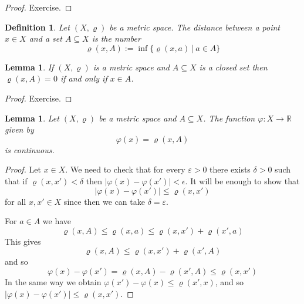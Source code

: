 \documentclass[11pt, letterpaper, oneside]{report}
\theoremstyle{pplain}
\newtheorem{lemma}[theorem]{Lemma}
\newtheorem{ITERMVALUE THM}[theorem]{Intermediate Value Theorem}
\newtheorem{HEINEBOREL THM}[theorem]{Heine-Borel Theorem}
\newtheorem{UMETR THM}[theorem]{Urysohn Metrization Theorem}
\newtheorem{UMETR2 THM}[theorem]{Urysohn Metrization Theorem (v.2)}
\theoremstyle{ddefinition}
\newtheorem{definition}[theorem]{Definition}
\theoremstyle{nnn}
\newtheorem{TDA NN}[theorem]{Topological Data Analysis. }
\theoremstyle{eexercise}
\newcommand{\R}{{\mathbb R}}
\begin{document}
 \begin{proof}
 Exercise. 
 \end{proof}


\begin{definition}
Let $(X, \varrho)$ be a metric space. The \emph{distance between a point  $x\in X$ 
and a set $A\subseteq X$} is  the number 
$$\varrho(x, A):= \inf\{ \varrho(x, a) \ | \  a\in A \} $$
\end{definition}

\begin{lemma}
\label{DIST CLOSED SET LEMMA}
If $(X, \varrho)$ is a metric space and $A\subseteq X$ is a closed set then $\varrho(x, A) = 0$ 
if and only if $x\in A$. 
\end{lemma}

\begin{proof}
Exercise.
\end{proof}


\begin{lemma}
\label{CONT SET DIST LEMMA}
Let $(X, \varrho)$ be a metric space and $A\subseteq X$.  The function $\varphi\colon X\to \R$
given by 
$$\varphi(x) = \varrho(x, A)$$
is continuous.
\end{lemma}

\begin{proof}
Let $x\in X$. We need to check that for every $\varepsilon>0$ there exists $\delta>0$ such that if 
$\varrho(x, x')< \delta$ then $|\varphi(x) - \varphi(x')| < \epsilon$.  It will be enough to show that 
$$|\varphi(x)-\varphi(x')| \leq \varrho(x, x')$$
for all $x, x'\in X$ since then we can take $\delta = \varepsilon$. 

For $a\in A$ we have 
$$\varrho(x, A) \leq \varrho(x, a) \leq \varrho(x, x') + \varrho(x', a)$$
This gives
$$\varrho(x, A) \leq \varrho(x, x') + \varrho(x', A)$$
and so 
$$\varphi(x)- \varphi(x')  = \varrho(x, A) - \varrho(x', A) \leq \varrho(x, x')$$
In the same way  we obtain $\varphi(x')- \varphi(x)   \leq \varrho(x', x)$,
 and so $|\varphi(x)- \varphi(x')| \leq \varrho(x, x')$.

\end{proof}
\end{document}
